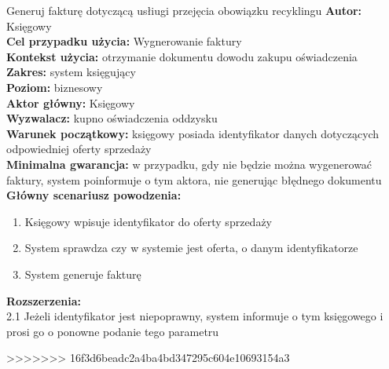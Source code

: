 \begin{usecase}{Generuj fakturę dotyczącą usłiugi przejęcia obowiązku recyklingu}
	\textbf{Autor:} Księgowy\\
	\textbf{Cel przypadku użycia:} Wygnerowanie faktury \\
	\textbf{Kontekst użycia:} otrzymanie dokumentu dowodu zakupu oświadczenia  \\
	\textbf{Zakres:} system księgujący \\
	\textbf{Poziom:} biznesowy \\
	\textbf{Aktor główny:} Księgowy \\
	\textbf{Wyzwalacz:} kupno oświadczenia oddzysku \\
	\textbf{Warunek początkowy:} księgowy posiada identyfikator danych dotyczących odpowiedniej oferty sprzedaży \\
	\textbf{Minimalna gwarancja:} w przypadku, gdy nie będzie można wygenerować faktury, system poinformuje o tym aktora, nie generując błędnego dokumentu \\
	\textbf{Główny scenariusz powodzenia:} 
		\begin{enumerate}
			\item Księgowy wpisuje identyfikator do oferty sprzedaży
			\item System sprawdza czy w systemie jest oferta, o danym identyfikatorze
			\item System generuje fakturę 
		\end{enumerate}
	\textbf{Rozszerzenia:} \\
	2.1 Jeżeli identyfikator jest niepoprawny, system informuje o tym księgowego i prosi go o ponowne podanie tego parametru
\end{usecase}
>>>>>>> 16f3d6beadc2a4ba4bd347295c604e10693154a3

